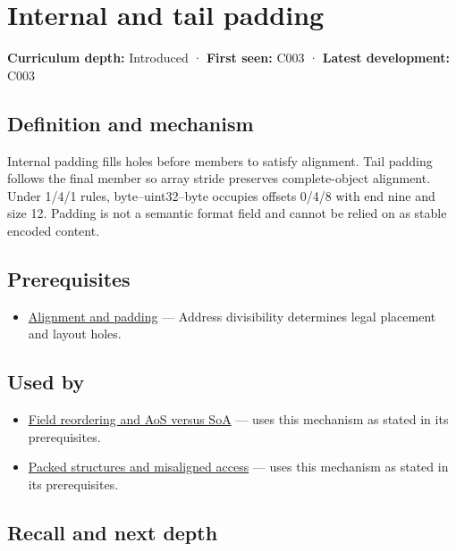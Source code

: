 \hypertarget{appendix-f52f8c5a3afd}{}\label{referencestart:appendix-f52f8c5a3afd}
\section{Internal and tail padding}\label{appendix-f52f8c5a3afd-internal-and-tail-padding}

\textbf{Curriculum depth:} Introduced · \textbf{First seen:} C003 · \textbf{Latest development:} C003

\subsection{Definition and mechanism}\label{appendix-f52f8c5a3afd-definition-and-mechanism}

Internal padding fills holes before members to satisfy alignment. Tail padding follows the final member so array stride preserves complete-object alignment. Under 1/4/1 rules, byte--uint32--byte occupies offsets 0/4/8 with end nine and size 12. Padding is not a semantic format field and cannot be relied on as stable encoded content.

\subsection{Prerequisites}\label{appendix-f52f8c5a3afd-prerequisites}

\begin{itemize}
\tightlist
\item
  \hyperref[appendix-a1f7c53b4742]{Alignment and padding} --- Address divisibility determines legal placement and layout holes.
\end{itemize}

\subsection{Used by}\label{appendix-f52f8c5a3afd-used-by}

\begin{itemize}
\tightlist
\item
  \hyperref[appendix-5522ad176ca0]{Field reordering and AoS versus SoA} --- uses this mechanism as stated in its prerequisites.
\item
  \hyperref[appendix-0682dbfc5f0e]{Packed structures and misaligned access} --- uses this mechanism as stated in its prerequisites.
\end{itemize}

\subsection{Recall and next depth}\label{appendix-f52f8c5a3afd-recall-and-next-depth}

